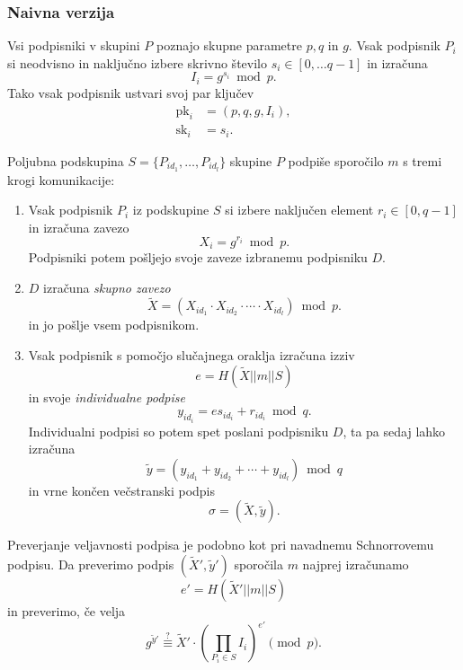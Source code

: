 \documentclass[isrm2, tisk]{fmfdelo}
\begin{document}
\subsubsection{Naivna verzija}
Vsi podpisniki v skupini $P$ poznajo skupne parametre $p, q$ in $g$. Vsak podpisnik $P_i$ si 
neodvisno in naključno izbere skrivno število $s_i \in [0, \dots q-1]$ in izračuna 
$$ 
I_i = g^{s_i} \bmod p.
$$
Tako vsak podpisnik ustvari svoj par ključev
\begin{align*}
    \text{pk}_i &= (p, q, g, I_i), \\
    \text{sk}_i &= s_i.
\end{align*}

Poljubna podskupina $S =\{P_{id_1}, \dots, P_{id_l}\}$ skupine $P$ podpiše sporočilo $m$ s tremi 
krogi komunikacije:
\begin{enumerate}
    \item Vsak podpisnik $P_i$ iz podskupine $S$ si izbere naključen element $r_i \in [0, q-1]$ 
        in izračuna zavezo 
        $$ 
        X_i = g^{r_i} \bmod p.
        $$
        Podpisniki potem pošljejo svoje zaveze izbranemu podpisniku $D$. 
    \item $D$ izračuna \textit{skupno zavezo} 
        $$ 
        \tilde{X} = (X_{id_1} \cdot X_{id_2} \cdot \cdots \cdot X_{id_l}) \bmod p.
        $$
        in jo pošlje vsem podpisnikom.
    \item Vsak podpisnik s pomočjo slučajnega oraklja izračuna izziv 
        $$ 
        e = H(\tilde{X} || m || S)
        $$
        in svoje \textit{individualne podpise} 
        $$ 
        y_{id_i} = e s_{id_i} + r_{id_i} \bmod q.
        $$
        Individualni podpisi so potem spet poslani podpisniku $D$, ta pa sedaj lahko 
        izračuna 
        $$ 
        \tilde{y} = (y_{id_1} + y_{id_2} + \cdots + y_{id_l}) \bmod q 
        $$
        in vrne končen večstranski podpis
        $$ 
        \sigma = (\tilde{X}, \tilde{y}).
        $$
\end{enumerate}

Preverjanje veljavnosti podpisa je podobno kot pri navadnemu Schnorrovemu podpisu. Da preverimo 
podpis $(\tilde{X}', \tilde{y}')$ sporočila $m$ najprej izračunamo 
$$ 
e' = H(\tilde{X}' || m || S)
$$ 
in preverimo, če velja 
\begin{equation}
\label{eq:naive-ver}
g^{\tilde{y}'} \stackrel{?}{\equiv} \tilde{X}' \cdot \left(\prod_{P_i \in S} I_i \right)^{e'} \pmod p.
\end{equation}
\end{document}
